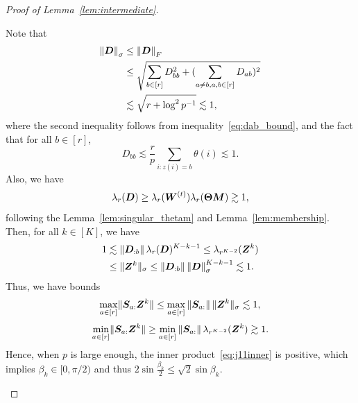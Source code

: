 \documentclass[journal]{IEEEtran}
\theoremstyle{definition}
\theoremstyle{definition}
\begin{document}
\begin{proof}[Proof of Lemma~\ref{lem:intermediate}]
\begin{enumerate}[wide]
    Note that 
    \begin{align}
        \onorm{\mD}_{\sigma} &\leq \onorm{\mD}_{F} \\
        &\leq  \sqrt{\sum_{b \in [r]} D_{bb}^2 + (\sum_{a \neq b, a ,b \in [r]} D_{ab} )^2} \\
        &\lesssim \sqrt{r  + \log^2 p^{-1}} \lesssim 1,\label{eq:singular_Du}
    \end{align}
    where the second inequality follows from inequality~\eqref{eq:dab_bound}, and the fact that for all $b \in [r]$,
    \begin{equation}
        D_{bb} \lesssim \frac{r}{p} \sum_{i\colon z(i) = b} \theta(i) \lesssim 1.
    \end{equation}
    Also, we have 
    \begin{equation}\label{eq:singular_Dl}
        \lambda_r(\mD) \geq \lambda_r(\mW^{(t)}) \lambda_r(\mTheta \mM) \gtrsim 1,
    \end{equation}
    following the Lemma~\ref{lem:singular_thetam} and Lemma~\ref{lem:membership}. Then, for all $k \in [K]$, we have 
    \begin{align}
        1 &\lesssim \onorm{\mD_{:b}} \lambda_r(\mD)^{K-k-1}  \leq \lambda_{r^{K-2}}(\mZ^{k}) \\
        &\leq \onormSize{}{\mZ^k}_{\sigma} \leq \onorm{\mD_{:b}} \onorm{\mD}_{\sigma}^{K-k-1} \lesssim 1.\label{eq:singular_z}
    \end{align}
    Thus, we have bounds 
    \begin{equation}
         \max_{a \in [r]} \lVert\bm S_{a:} \bm Z^k\rVert \leq \max_{a \in [r]} \left\lVert\bm S_{a:}\right\rVert \lVert\bm Z^k\rVert_{\sigma} \lesssim 1, 
    \end{equation}
    \begin{equation}
        \min_{a \in [r]} \lVert\bm S_{a:}\bm Z^k\rVert  \geq \min_{a \in [r]} \left\lVert\bm S_{a:}\right\rVert \lambda_{r^{K-2}}(\bm Z^{k}) \gtrsim 1.
    \end{equation}
    Hence, when $p$ is large enough, the inner product~\eqref{eq:j11inner} is positive, which implies $\beta_k \in [0, \pi/2)$ and thus $2 \sin \frac{\beta_k}{2} \leq \sqrt{2} \sin \beta_k$.
    

\end{enumerate}
\end{proof}
\end{document}
